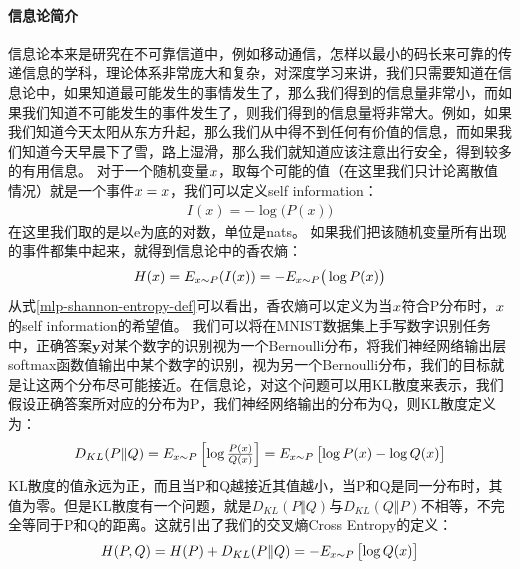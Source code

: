 \documentclass[UTF8]{article}
\begin{document}
\paragraph{信息论简介}
信息论本来是研究在不可靠信道中，例如移动通信，怎样以最小的码长来可靠的传递信息的学科，理论体系非常庞大和复杂，对深度学习来讲，我们只需要知道在信息论中，如果知道最可能发生的事情发生了，那么我们得到的信息量非常小，而如果我们知道不可能发生的事件发生了，则我们得到的信息量将非常大。例如，如果我们知道今天太阳从东方升起，那么我们从中得不到任何有价值的信息，而如果我们知道今天早晨下了雪，路上湿滑，那么我们就知道应该注意出行安全，得到较多的有用信息。\newline
对于一个随机变量$\boldmath{x}$，取每个可能的值（在这里我们只计论离散值情况）就是一个事件$\boldmath{x}=x$，我们可以定义self information：
\begin{equation}
\begin{aligned}
I(x)=-\log\big( P(x) \big)
\end{aligned}
\label{mlp-self-information-def}
\end{equation}
在这里我们取的是以e为底的对数，单位是nats。\newline
如果我们把该随机变量所有出现的事件都集中起来，就得到信息论中的香农熵：
\begin{equation}
\begin{aligned}
H(\boldmath{x})=E_{\boldmath{x} \sim P}(I(\boldmath{x}))=-E_{\boldmath{x} \sim P}\big(\log{P(\boldmath{x})}\big)
\end{aligned}
\label{mlp-shannon-entropy-def}
\end{equation}
从式\ref{mlp-shannon-entropy-def}可以看出，香农熵可以定义为当$\boldmath{x}$符合P分布时，$\boldmath{x}$的self information的希望值。\newline
我们可以将在MNIST数据集上手写数字识别任务中，正确答案$\boldsymbol{y}$对某个数字的识别视为一个Bernoulli分布，将我们神经网络输出层softmax函数值输出中某个数字的识别，视为另一个Bernoulli分布，我们的目标就是让这两个分布尽可能接近。在信息论，对这个问题可以用KL散度来表示，我们假设正确答案所对应的分布为P，我们神经网络输出的分布为Q，则KL散度定义为：
\begin{equation}
\begin{aligned}
D_{KL}(P \Vert Q)=E_{\boldmath{x} \sim P}\begin{bmatrix}
\log{  \frac{P(x)}{Q(x)}  }
\end{bmatrix}=E_{\boldmath{x} \sim P}\begin{bmatrix}
\log{P(x)} - \log{Q(x)}
\end{bmatrix}
\end{aligned}
\label{mlp-kl-divergence-def}
\end{equation}
KL散度的值永远为正，而且当P和Q越接近其值越小，当P和Q是同一分布时，其值为零。但是KL散度有一个问题，就是$D_{KL}(P \Vert Q)$与$D_{KL}(Q \Vert P)$不相等，不完全等同于P和Q的距离。这就引出了我们的交叉熵Cross Entropy的定义：
\begin{equation}
\begin{aligned}
H(P,Q)=H(P) + D_{KL}(P \Vert Q)=-E_{\boldmath{x} \sim P}\begin{bmatrix}
\log{Q(x)}
\end{bmatrix}
\end{aligned}
\label{mlp-crossentropy-def}
\end{equation}
\end{document}
